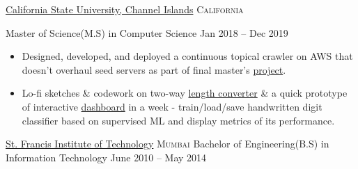 \documentclass[11pt,a4paper]{article}
\begin{document}
\headedsection
  {\href{https://www.csuci.edu/}{California State University, Channel Islands}}
  {\textsc{California}} {%
  \headedsubsection
    {Master of Science(M.S) in Computer Science}
    {Jan 2018 -- Dec 2019}
    {
      \begin{itemize}
        \item Designed, developed, and deployed a continuous topical crawler on AWS that doesn't overhaul seed servers as part of final master's \href{https://github.com/rihbyne/csuci-mscs-thesis-dist-web-crawler/blob/master/initial-writeup/initialwriteup.pdf}{project}.
        \item Lo-fi sketches \& codework on two-way \href{https://github.com/rihbyne/linear-length-converter}{length converter} \& a quick prototype of interactive \href{https://github.com/rihbyne/watch-ml-behave}{dashboard} in a week - train/load/save handwritten digit classifier based on supervised ML and display metrics of its performance.
      \end{itemize}
    }
  }

\headedsection
  {\href{http://www.mu.ac.in/}{St. Francis Institute of Technology}}
  {\textsc{Mumbai}} {%
  \headedsubsection
    {Bachelor of Engineering(B.S) in Information Technology}
    {June 2010 -- May 2014}
    {}
    {
    }
}
\end{document}
